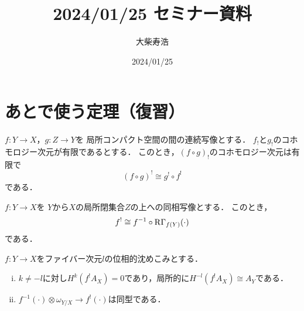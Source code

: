 






\title{2024/01/25 セミナー資料}
\author{大柴寿浩}
\date{2024/01/25}

\maketitle

\section*{あとで使う定理（復習）}
\begin{leftbar}
\begin{PRP}[{\cite[Proposition 3.1.8]{KS90}}]\label{PRP318}
    \(f\colon Y\to X\)，\(g\colon Z\to Y\)を
    局所コンパクト空間の間の連続写像とする．
    \(f_!\)と\(g_!\)のコホモロジー次元が有限であるとする．
    このとき，\((f\circ g)_!\)のコホモロジー次元は有限で
    \[
        (f\circ g)^!\cong g^!\circ f^!
    \]である．
\end{PRP}
\end{leftbar}
\begin{leftbar}
    \begin{PRP}[{\cite[Proposition 3.1.12]{KS90}}]\label{PRP3112}
        \(f\colon Y\to X\)を
        \(Y\)から\(X\)の局所閉集合\(Z\)の上への同相写像とする．
        このとき，
        \[
            f^!\cong f^{-1}\circ \mathop{\mathrm{R}\hspace{-0pt}\Gamma}\nolimits_{f(Y)}(\cdot)
        \]である．
    \end{PRP}
\end{leftbar}

\begin{leftbar}
    \begin{PRP}[{\cite[Proposition 3.3.2]{KS90}}]\label{PRP332}
        \(f\colon Y\to X\)をファイバー次元\(l\)の位相的沈めこみとする．
        \begin{enumerate}[(i)]
            \item \(k\ne -l\)に対し\(H^k(f^!A_X)=0\)であり，局所的に\(H^{-l}(f^!A_X)\cong A_Y\)である．
            \item \(f^{-1}(\cdot)\otimes\omega_{Y/X}\to f^!(\cdot)\)は同型である．\label{332-2}
        \end{enumerate}
    \end{PRP}    
\end{leftbar}
